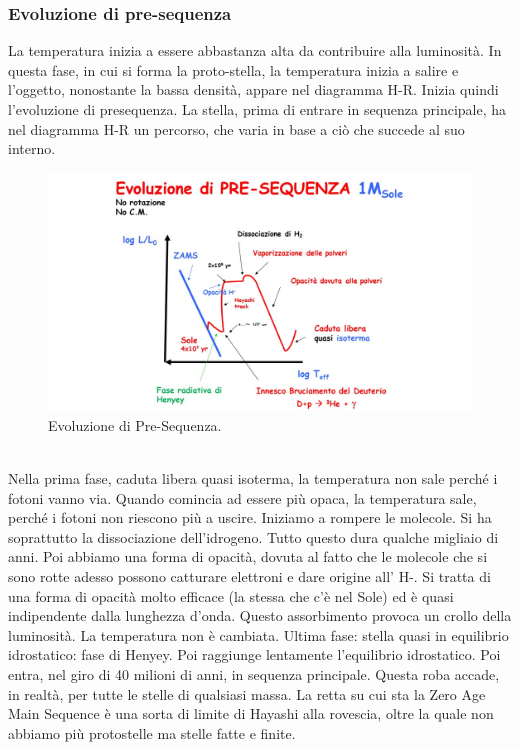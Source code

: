 \documentclass[a4paper,11pt]{article}
\begin{document}
    \subsubsection{Evoluzione di pre-sequenza}
La temperatura inizia a essere abbastanza alta da contribuire alla luminosità. In questa fase, in cui si forma la proto-stella, la temperatura inizia a salire e l'oggetto, nonostante la bassa densità, appare nel diagramma H-R. Inizia quindi l'evoluzione di presequenza. La stella, prima di entrare in sequenza principale, ha nel diagramma H-R un percorso, che varia in base a ciò che succede al suo interno.
\begin{figure}[h!!]
        \centering
        \includegraphics[width=15cm]{lezione 28 novembre/pirronello.jpg}
        \caption{Evoluzione di Pre-Sequenza.}
        \label{lezione 28 novembre/pirronello.jpg}
    \end{figure}
    \\
Nella prima fase, caduta libera quasi isoterma, la temperatura non sale perché i fotoni vanno via. Quando comincia ad essere più opaca, la temperatura sale, perché i fotoni non riescono più a uscire. Iniziamo a rompere le molecole. Si ha soprattutto la dissociazione dell'idrogeno. Tutto questo dura qualche migliaio di anni. Poi abbiamo una forma di opacità, dovuta al fatto che le molecole che si sono rotte adesso possono catturare elettroni e dare origine all' H-. Si tratta di una forma di opacità molto efficace (la stessa che c'è nel Sole) ed è quasi indipendente dalla lunghezza d'onda. Questo assorbimento provoca un crollo della luminosità. La temperatura non è cambiata. Ultima fase: stella quasi in equilibrio idrostatico: fase di Henyey. Poi raggiunge lentamente l'equilibrio idrostatico. Poi entra, nel giro di 40 milioni di anni, in sequenza principale. Questa roba accade, in realtà, per tutte le stelle di qualsiasi massa. La retta su cui sta la Zero Age Main Sequence è una sorta di limite di Hayashi alla rovescia, oltre la quale non abbiamo più protostelle ma stelle fatte e finite. \\ 
\end{document}
